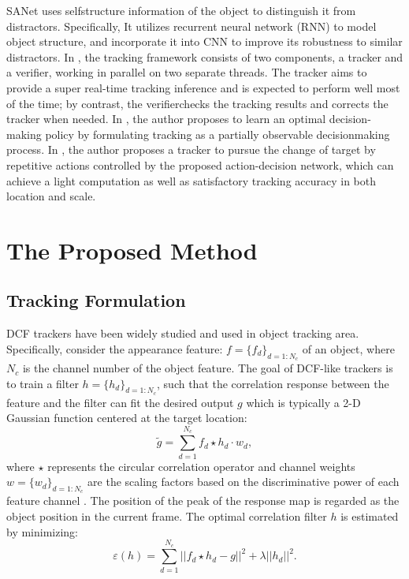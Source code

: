\documentclass[review]{elsarticle}
\begin{document}
\begin{CJK*}{UTF8}{gbsn}
SANet \cite{Fan2016SANetSN} uses selfstructure information of the object to distinguish it from distractors. Specifically, It utilizes recurrent neural network (RNN) to model object structure, and incorporate it into CNN to improve its robustness to similar distractors. 
In \cite{fan2017parallel}, the tracking framework consists of two components, a tracker and a verifier, working in parallel on two separate threads. The tracker aims to provide a super real-time tracking inference and is expected to perform well most of the time; by contrast, the verifierchecks the tracking results and corrects the tracker when needed. 
In \cite{supancic2017tracking}, the author proposes to learn an optimal decision-making policy by formulating tracking as a partially observable decisionmaking process. 
In \cite{yun2017action}, the author proposes a tracker to pursue the change of target by repetitive actions controlled by the proposed action-decision network, which can achieve a light computation as well as satisfactory tracking accuracy in both location and scale.

\section{The Proposed Method}

\subsection{Tracking Formulation} \label{sec:InstMask}
DCF trackers \cite{Bolme2010VisualOT, Danelljan2014AccurateSE, Henriques2015HighSpeedTW, Li2014ASA} have been widely studied and used in object tracking area. Specifically, consider the appearance feature: $f=\{f_d\}_{d=1:N_c}$ of an object, where $N_c$ is the channel number of the object feature. The goal of DCF-like trackers is to train a filter $h=\{h_d\}_{d=1:N_c}$, such that the correlation response between the feature and the filter can fit the desired output $g$ which is typically a 2-D Gaussian function centered at the target location: 
\begin{equation} \label{eq:dcf}
\tilde{g}=\sum_{d=1}^{N_c}f_d \star h_d \cdot w_d,
\end{equation}
where $\star$ represents the circular correlation operator and channel weights $w = \{w_d\}_{d=1:N_c}$ are the scaling factors based on the discriminative power of each feature channel \cite{Lukezic2017DiscriminativeCF}.
The position of the peak of the response map is regarded as the object position in the current frame.
The optimal correlation filter $h$ is estimated by minimizing:
\begin{equation}
\varepsilon(h) = \sum_{d=1}^{N_c}||f_d \star h_d - g||^2+\lambda||h_d||^2.
\end{equation}


\end{CJK*}
\end{document}
